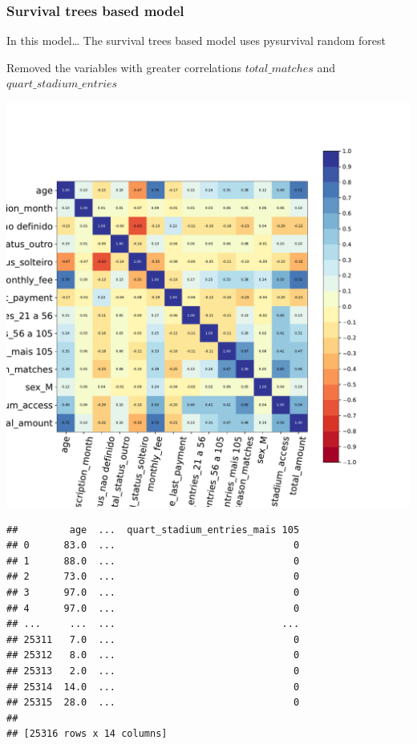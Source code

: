 \documentclass[
  12pt,
]{article}
\begin{document}
\hypertarget{survival-trees-based-model}{%
\subsubsection{Survival trees based model}\label{survival-trees-based-model}}

In this model\ldots{} The survival trees based model uses pysurvival random forest

Removed the variables with greater correlations \(total\_matches\) and
\(quart\_stadium\_entries\)

\includegraphics{articleCustomerDropoutMembership_files/figure-latex/removeVar-1.pdf}

\begin{verbatim}
##         age  ...  quart_stadium_entries_mais 105
## 0      83.0  ...                               0
## 1      88.0  ...                               0
## 2      73.0  ...                               0
## 3      97.0  ...                               0
## 4      97.0  ...                               0
## ...     ...  ...                             ...
## 25311   7.0  ...                               0
## 25312   8.0  ...                               0
## 25313   2.0  ...                               0
## 25314  14.0  ...                               0
## 25315  28.0  ...                               0
## 
## [25316 rows x 14 columns]
\end{verbatim}
\end{document}
